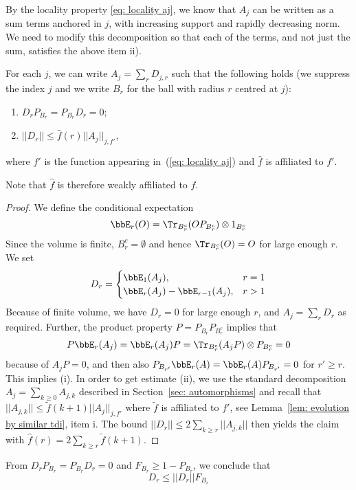 By the locality property \eqref{eq: locality aj}, we know that $A_j$ can be written as a sum terms anchored in $j$, with increasing support and  rapidly decreasing norm.
We need to modify this decomposition so that each of the terms, and not just the sum, satisfies the above item ii).
\begin{lemma}\label{lemma: Drs} For each $j$, we can write $A_j=\sum_{r} D_{j,r}$ such that the following holds (we suppress the index $j$ and we write $B_r$ for the ball with radius $r$ centred at $j$):
	\begin{enumerate}
		\item      $D_r P_{B_r}= P_{B_r} D_r=0$;
		\item  $|| D_r || \leq  \hat f(r) || A_j ||_{j,f'}  $,
	\end{enumerate}
	where $f'$ is the function appearing in~(\ref{eq: locality aj}) and $\hat f$ is affiliated to $f'$.
\end{lemma}
Note that $\hat f$ is therefore weakly affiliated to $f$. 
\begin{proof}
	We define the conditional expectation 
	$$\bbE_r(O)=\Tr_{{B_r^c}}(OP_{B_r^c}) \otimes 1_{B_r^c} 
	$$
	Since the volume is finite,  $B_r^c=\emptyset$ and hence $\Tr_{{B_r^c}}(O)=O$ for large enough $r$.  We set
	\begin{equation*}
		D_r = \begin{cases}
			\bbE_{1}(A_j), & r=1 \\
			\bbE_r(A_j) -\bbE_{r-1}(A_j), & r>1
		\end{cases} 
	\end{equation*}
	Because of finite volume, we have $D_r=0$ for large enough $r$, and $A_j=\sum_{r} D_r$ as required.
	Further, the product property $P=P_{B_r}P_{B^c_r}$ implies that $$P\bbE_r(A_j)=\bbE_r(A_j)P=\Tr_{{B_r^c}}(A_jP) \otimes P_{B_r^c} = 0$$ because of $A_jP=0$, and then also $P_{B_{r'}}\bbE_r(A)=\bbE_r(A)P_{B_{r'}}=0$ for $r'\geq r$. This implies (i). In order to get estimate (ii), we use the standard decomposition $A_j = \sum_{k\geq0} A_{j,k}$ described in Section~\ref{sec: automorphisms} and recall that $||A_{j,k}||\leq \tilde f(k+1)||A_j||_{j,f'}$ where $\tilde f$ is affiliated to $f'$, see Lemma~\ref{lem: evolution by similar tdi}, item i.
	The bound $|| D_r ||\leq 2 \sum_{k\geq r} || A_{j,k} ||$ then yields the claim with $\hat f(r) = 2\sum_{k\geq r}\tilde f(k+1)$.
\end{proof}
%
From $D_rP_{B_r}= P_{B_r} D_r=0$ and $F_{B_r} \geq 1-P_{B_r}$, we conclude that 
\begin{equation}\label{DnF}
	D_r \leq  ||D_r||  F_{B_r}
\end{equation}
